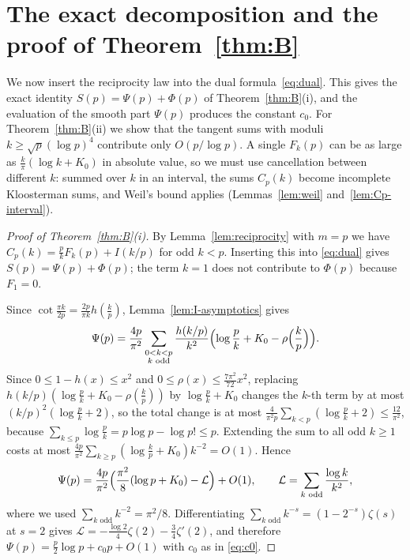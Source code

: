 \providecommand{\sgn}{\operatorname{sgn}}
\providecommand{\dpar}[1]{(\!(#1)\!)}   %
\section{The exact decomposition and the proof of Theorem~\texorpdfstring{\ref{thm:B}}{B}}\label{sec:decomposition}

We now insert the reciprocity law into the dual formula~\eqref{eq:dual}. This gives the exact identity $S(p)=\Psi(p)+\Phi(p)$ of Theorem~\ref{thm:B}(i), and the evaluation of the smooth part $\Psi(p)$ produces the constant $c_0$. For Theorem~\ref{thm:B}(ii) we show that the tangent sums with moduli $k\ge\sqrt p(\log p)^4$ contribute only $O(p/\log p)$. A single $F_k(p)$ can be as large as $\frac k\pi(\log k+K_0)$ in absolute value, so we must use cancellation between different $k$: summed over $k$ in an interval, the sums $C_p(k)$ become incomplete Kloosterman sums, and Weil's bound applies (Lemmas~\ref{lem:weil} and~\ref{lem:Cp-interval}).

\begin{proof}[Proof of Theorem~\ref{thm:B}\textup{(i)}]
By Lemma~\ref{lem:reciprocity} with $m=p$ we have $C_p(k)=\frac pkF_k(p)+I(k/p)$ for odd $k<p$. Inserting this into \eqref{eq:dual}
gives $S(p)=\Psi(p)+\Phi(p)$; the term $k=1$ does not contribute to $\Phi(p)$ because $F_1=0$.

Since $\cot\frac{\pi k}{2p}=\frac{2p}{\pi k}h(\frac kp)$, Lemma~\ref{lem:I-asymptotics} gives
\[
\Psi(p)=\frac{4p}{\pi^2}\sum_{\substack{0<k<p\\ k\text{ odd}}}\frac{h(k/p)}{k^2}\Bigl(\log\frac pk+K_0-\rho\Bigl(\frac kp\Bigr)\Bigr).
\]
Since $0\le1-h(x)\le x^2$ and $0\le\rho(x)\le\frac{7\pi^2}{72}x^2$, replacing $h(k/p)(\log\frac pk+K_0-\rho(\frac kp))$
by $\log\frac pk+K_0$ changes the $k$-th term by at most $(k/p)^2(\log\frac pk+2)$, so the total change is at most
$\frac{4}{\pi^2p}\sum_{k<p}(\log\frac pk+2)\le\frac{12}{\pi^2}$, because $\sum_{k\le p}\log\frac pk=p\log p-\log p!\le p$.
Extending the sum to all odd $k\ge1$ costs at most $\frac{4p}{\pi^2}\sum_{k\ge p}(\log\frac kp+K_0)k^{-2}=O(1)$. Hence
\[
\Psi(p)=\frac{4p}{\pi^2}\Bigl(\frac{\pi^2}{8}(\log p+K_0)-\mathcal L\Bigr)+O(1),\qquad \mathcal L=\sum_{k\text{ odd}}\frac{\log k}{k^2},
\]
where we used $\sum_{k\text{ odd}}k^{-2}=\pi^2/8$. Differentiating $\sum_{k\text{ odd}}k^{-s}=(1-2^{-s})\zeta(s)$ at $s=2$
gives $\mathcal L=-\frac{\log2}{4}\zeta(2)-\frac34\zeta'(2)$, and therefore $\Psi(p)=\frac p2\log p+c_0p+O(1)$ with $c_0$ as in
\eqref{eq:c0}.
\end{proof}

